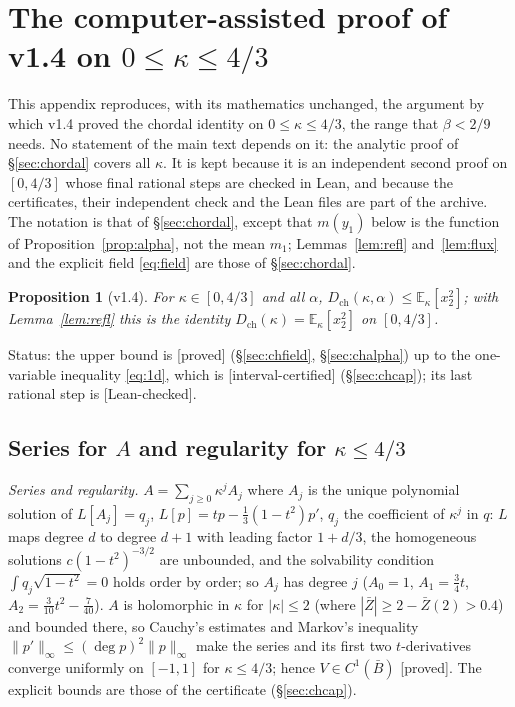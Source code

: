 \documentclass[11pt,a4paper]{article}
\newtheorem{proposition}[theorem]{Proposition}
\theoremstyle{remark}
\theoremstyle{definition}
\theoremstyle{plain}
\theoremstyle{remark}
\newcommand{\E}{\mathbb{E}}
\newcommand{\st}[1]{\textsf{[#1]}}
\newcommand{\Zb}{\bar Z}
\newcommand{\Dch}{D_{\mathrm{ch}}}
\begin{document}
\appendix
\section{The computer-assisted proof of v1.4 on $0\le\kappa\le4/3$}\label{app:v14}

This appendix reproduces, with its mathematics unchanged, the argument by which v1.4 proved the chordal identity on $0\le\kappa\le4/3$, the range that $\beta<2/9$ needs. No statement of the main text depends on it: the analytic proof of
\S\ref{sec:chordal} covers all $\kappa$. It is kept because it is an independent second proof on $[0,4/3]$ whose final rational steps are checked in Lean, and because the certificates, their independent check and the Lean files are part
of the archive. The notation is that of \S\ref{sec:chordal}, except that $m(y_1)$ below is the function of Proposition~\ref{prop:alpha}, not the mean $m_1$; Lemmas~\ref{lem:refl} and~\ref{lem:flux} and the explicit field \eqref{eq:field} are those of
\S\ref{sec:chordal}.

\begin{proposition}[v1.4]\label{prop:v14}
For $\kappa\in[0,4/3]$ and all $\alpha$, $\Dch(\kappa,\alpha)\le\E_\kappa[x_2^2]$; with Lemma~\ref{lem:refl} this is the identity $\Dch(\kappa)=\E_\kappa[x_2^2]$ on $[0,4/3]$.
\end{proposition}
\noindent Status: the upper bound is \st{proved} (\S\ref{sec:chfield}, \S\ref{sec:chalpha}) up to the one-variable inequality \eqref{eq:1d}, which is \st{interval-certified} (\S\ref{sec:chcap}); its last rational step is \st{Lean-checked}.

\subsection{Series for $A$ and regularity for $\kappa\le4/3$}\label{sec:chseries}

\emph{Series and regularity.} $A=\sum_{j\ge0}\kappa^jA_j$ where $A_j$ is the unique polynomial solution of
$L[A_j]=q_j$, $L[p]=tp-\frac13(1-t^2)p'$, $q_j$ the coefficient of $\kappa^j$ in $q$: $L$ maps degree $d$ to
degree $d+1$ with leading factor $1+d/3$, the homogeneous solutions $c(1-t^2)^{-3/2}$ are unbounded, and the
solvability condition $\int q_j\sqrt{1-t^2}=0$ holds order by order; so $A_j$ has degree $j$
($A_0=1$, $A_1=\frac34t$, $A_2=\frac3{10}t^2-\frac7{40}$). $A$ is holomorphic in $\kappa$ for $|\kappa|\le2$ (where
$|\Zb|\ge2-\Zb(2)>0.4$) and bounded there, so Cauchy's estimates and Markov's inequality $\|p'\|_\infty\le
(\deg p)^2\|p\|_\infty$ make the series and its first two $t$-derivatives converge uniformly on $[-1,1]$ for
$\kappa\le4/3$; hence $V\in C^1(\bar B)$ \st{proved}. The explicit bounds are those of the certificate
(\S\ref{sec:chcap}).
\end{document}

